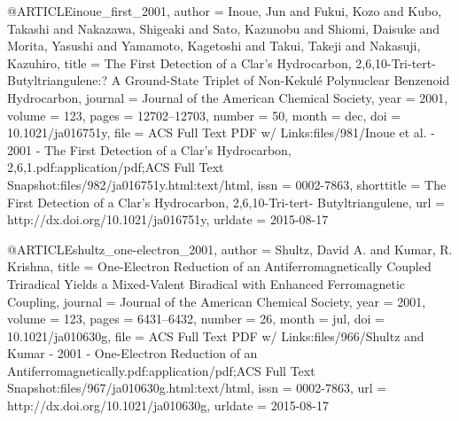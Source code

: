 @ARTICLE{inoue_first_2001,
  author = {Inoue, Jun and Fukui, Kozo and Kubo, Takashi and Nakazawa, Shigeaki
	and Sato, Kazunobu and Shiomi, Daisuke and Morita, Yasushi and Yamamoto,
	Kagetoshi and Takui, Takeji and Nakasuji, Kazuhiro},
  title = {The {First} {Detection} of a {Clar}'s {Hydrocarbon}, 2,6,10-{Tri}-tert-{Butyltriangulene}:?
	{A} {Ground}-{State} {Triplet} of {Non}-{Kekulé} {Polynuclear} {Benzenoid}
	{Hydrocarbon}},
  journal = {Journal of the American Chemical Society},
  year = {2001},
  volume = {123},
  pages = {12702--12703},
  number = {50},
  month = dec,
  doi = {10.1021/ja016751y},
  file = {ACS Full Text PDF w/ Links:files/981/Inoue et al. - 2001 - The First Detection of a Clar's     Hydrocarbon, 2,6,1.pdf:application/pdf;ACS Full Text Snapshot:files/982/ja016751y.html:text/html},
  issn = {0002-7863},
  shorttitle = {The {First} {Detection} of a {Clar}'s {Hydrocarbon}, 2,6,10-{Tri}-tert-
	{Butyltriangulene}},
  url = {http://dx.doi.org/10.1021/ja016751y},
  urldate = {2015-08-17}
}

@ARTICLE{shultz_one-electron_2001,
  author = {Shultz, David A. and Kumar, R. Krishna},
  title = {One-{Electron} {Reduction} of an {Antiferromagnetically} {Coupled}
	{Triradical} {Yields} a {Mixed}-{Valent} {Biradical} with {Enhanced}
	{Ferromagnetic} {Coupling}},
  journal = {Journal of the American Chemical Society},
  year = {2001},
  volume = {123},
  pages = {6431--6432},
  number = {26},
  month = jul,
  doi = {10.1021/ja010630g},
  file = {ACS Full Text PDF w/ Links:files/966/Shultz and Kumar - 2001 - One-Electron Reduction of an      Antiferromagnetically.pdf:application/pdf;ACS Full Text Snapshot:files/967/ja010630g.html:text/html},
  issn = {0002-7863},
  url = {http://dx.doi.org/10.1021/ja010630g},
  urldate = {2015-08-17}
}

